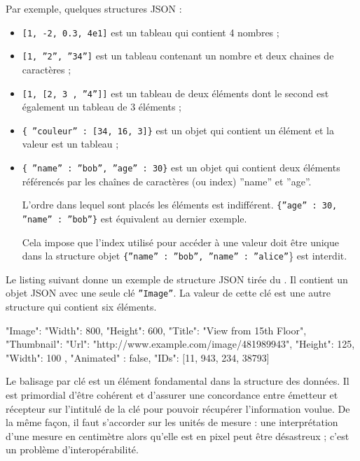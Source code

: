 Par exemple, quelques structures \ac{JSON} :

\begin{itemize}
    \item \texttt{[1, -2, 0.3, 4e1]} est un tableau qui contient 4 nombres ;
    \item \texttt{[1, ”2”, ”34”]} est un tableau contenant un nombre et deux chaines de caractères ;
    \item \texttt{[1, [2, 3 , ”4”]]} est un tableau de deux éléments dont le second est également un tableau de 3 éléments ;
    \item \texttt{\{ ”couleur” : [34, 16, 3]\}} est un objet qui contient un élément et la valeur est un tableau ; 
    \item \texttt{\{ ”name” : ”bob”, ”age” : 30\}} est un objet qui contient deux éléments référencés par les chaînes de caractères (ou index)  ”name” et ”age”.
    
    L’ordre dans lequel sont placés les éléments est indifférent. \texttt{\{”age” : 30, ”name” : ”bob”\}} est équivalent au dernier exemple. 

    Cela impose que l’index utilisé pour accéder à une valeur doit être unique dans la structure objet \texttt{\{”name” : ”bob”, ”name” : ”alice”}\} est interdit.
\end{itemize}

     \vspace{1em}

Le listing suivant donne un exemple de structure JSON tirée du . Il contient un objet JSON avec une seule clé \texttt{”Image”}. La valeur de cette clé est une autre structure qui contient six éléments. 

\begin{termc}[backgroundcolor=\color{palerod}, language=json]
{
"Image": {
      "Width": 800,
      "Height": 600,
      "Title": "View from 15th Floor",
      "Thumbnail": {   
           "Url": "http://www.example.com/image/481989943",
           "Height": 125,
           "Width": 100
       },
       "Animated" : false,
       "IDs": [11, 943, 234, 38793]
    }
}
\end{termc}

Le balisage par clé est un élément fondamental dans la structure des données. Il est primordial d'être cohérent et d'assurer une concordance entre émetteur et récepteur sur l'intitulé de la clé pour pouvoir récupérer l'information voulue. De la même façon, il faut s'accorder sur les unités de mesure : une interprétation d'une mesure en centimètre alors qu'elle est en pixel peut être désastreux ; c'est un problème d'interopérabilité.
     \vspace{1em}

